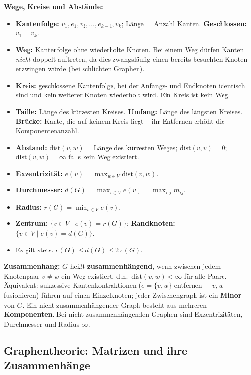 \textbf{Wege, Kreise und Abstände:}
\begin{itemize}[leftmargin=1.5em]
    \item \textbf{Kantenfolge:} $v_1,e_1,v_2,\ldots,e_{k-1},v_k$; Länge = Anzahl Kanten. \textbf{Geschlossen:} $v_1=v_k$.
    \item \textbf{Weg:} Kantenfolge ohne wiederholte Knoten. Bei einem Weg dürfen Kanten \emph{nicht} doppelt auftreten, da dies zwangsläufig einen bereits besuchten Knoten erzwingen würde (bei schlichten Graphen).
    \item \textbf{Kreis:} geschlossene Kantenfolge, bei der Anfangs- und Endknoten identisch sind und kein weiterer Knoten wiederholt wird. Ein Kreis ist kein Weg.
    \item \textbf{Taille:} Länge des kürzesten Kreises. \textbf{Umfang:} Länge des längsten Kreises. \textbf{Brücke:} Kante, die auf keinem Kreis liegt -- ihr Entfernen erhöht die Komponentenanzahl.
    \item \textbf{Abstand:} $\mathrm{dist}(v,w)$ = Länge des kürzesten Weges; $\mathrm{dist}(v,v)=0$; $\mathrm{dist}(v,w)=\infty$ falls kein Weg existiert.
    \item \textbf{Exzentrizität:} $e(v)=\max_{w\in V}\mathrm{dist}(v,w)$.
    \item \textbf{Durchmesser:} $d(G)=\max_{v\in V}e(v)=\max_{i,j}m_{ij}$.
    \item \textbf{Radius:} $r(G)=\min_{v\in V}e(v)$.
    \item \textbf{Zentrum:} $\{v\in V\mid e(v)=r(G)\}$; \textbf{Randknoten:} $\{v\in V\mid e(v)=d(G)\}$.
    \item Es gilt stets: $r(G)\leq d(G)\leq 2\,r(G)$.
\end{itemize}

\textbf{Zusammenhang:} $G$ heißt \textbf{zusammenhängend}, wenn zwischen jedem Knotenpaar $v\neq w$ ein Weg existiert, d.h.\ $\mathrm{dist}(v,w)<\infty$ für alle Paare. Äquivalent: sukzessive Kantenkontraktionen ($e=\{v,w\}$ entfernen + $v,w$ fusionieren) führen auf einen Einzelknoten; jeder Zwischengraph ist ein \textbf{Minor} von $G$. Ein nicht zusammenhängender Graph besteht aus mehreren \textbf{Komponenten}. Bei nicht zusammenhängenden Graphen sind Exzentrizitäten, Durchmesser und Radius $\infty$.

\newpage

\subsection{Graphentheorie: Matrizen und ihre Zusammenhänge}

